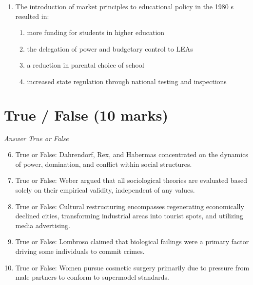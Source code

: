 \documentclass[12pt]{article}
\begin{document}
\begin{enumerate}[label=\arabic*.]
\begin{enumerate}[label=(\alph*)]
    \item its theories are logical, explicit and supported by empirical evidence
    \item sociologists collect data in a relatively objective and systematic way
    \item ideas and research findings are scrutinized by other sociologists
    \item all of the above
\end{enumerate}
\item The introduction of market principles to educational policy in the 1980 s resulted in:
\begin{enumerate}[label=(\alph*)]
    \item more funding for students in higher education
    \item the delegation of power and budgetary control to LEAs
    \item a reduction in parental choice of school
    \item increased state regulation through national testing and inspections
\end{enumerate}
\end{enumerate}

\section*{True / False (10 marks)}
\textit{Answer True or False}
\begin{enumerate}[label=\arabic*.]
\setcounter{enumi}{5}
\item True or False: Dahrendorf, Rex, and Habermas concentrated on the dynamics of power, domination, and conflict within social structures.
\item True or False: Weber argued that all sociological theories are evaluated based solely on their empirical validity, independent of any values.
\item True or False: Cultural restructuring encompasses regenerating economically declined cities, transforming industrial areas into tourist spots, and utilizing media advertising.
\item True or False: Lombroso claimed that biological failings were a primary factor driving some individuals to commit crimes.
\item True or False: Women pursue cosmetic surgery primarily due to pressure from male partners to conform to supermodel standards.
\end{enumerate}
\end{document}
